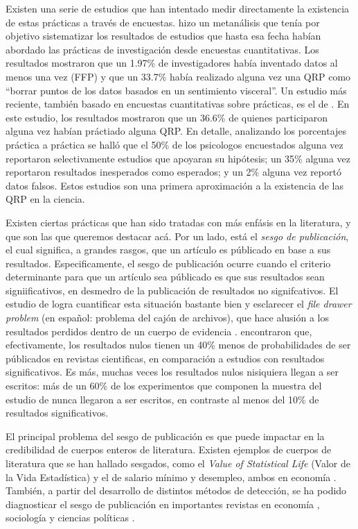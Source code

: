 \documentclass[
]{book}
\begin{document}
Existen una serie de estudios que han intentado medir directamente la existencia de estas prácticas a través de encuestas. \citet{fanelli_How_2009} hizo un metanálisis que tenía por objetivo sistematizar los resultados de estudios que hasta esa fecha habían abordado las prácticas de investigación desde encuestas cuantitativas. Los resultados mostraron que un 1.97\% de investigadores había inventado datos al menos una vez (FFP) y que un 33.7\% había realizado alguna vez una QRP como ``borrar puntos de los datos basados en un sentimiento visceral''. Un estudio más reciente, también basado en encuestas cuantitativas sobre prácticas, es el de \citet{john_Measuring_2012}. En este estudio, los resultados mostraron que un 36.6\% de quienes participaron alguna vez habían práctiado alguna QRP. En detalle, analizando los porcentajes práctica a práctica se halló que el 50\% de los psicologos encuestados alguna vez reportaron selectivamente estudios que apoyaran su hipótesis; un 35\% alguna vez reportaron resultados inesperados como esperados; y un 2\% alguna vez reportó datos falsos. Estos estudios son una primera aproximación a la existencia de las QRP en la ciencia.

Existen ciertas prácticas que han sido tratadas con más enfásis en la literatura, y que son las que queremos destacar acá. Por un lado, está el \emph{sesgo de publicación}, el cual significa, a grandes rasgos, que un artículo es públicado en base a sus resultados. Especificamente, el sesgo de publicación ocurre cuando el criterio determinante para que un artículo sea públicado es que sus resultados sean signiificativos, en desmedro de la publicación de resultados no signifcativos. El estudio de \citet{franco_Publication_2014} logra cuantificar esta situación bastante bien y esclarecer el \emph{file drawer problem} (en español: problema del cajón de archivos), que hace alusión a los resultados perdidos dentro de un cuerpo de evidencia \citep[p.39]{christensen_Transparent_2019}. \citet{franco_Publication_2014} encontraron que, efectivamente, los resultados nulos tienen un 40\% menos de probabilidades de ser públicados en revistas cientificas, en comparación a estudios con resultados significativos. Es más, muchas veces los resultados nulos nisiquiera llegan a ser escritos: más de un 60\% de los experimentos que componen la muestra del estudio de \citet{franco_Publication_2014} nunca llegaron a ser escritos, en contraste al menos del 10\% de resultados significativos.

El principal problema del sesgo de publicación es que puede impactar en la credibilidad de cuerpos enteros de literatura. Existen ejemplos de cuerpos de literatura que se han hallado sesgados, como el \emph{Value of Statistical Life} (Valor de la Vida Estadística) y el de salario mínimo y desempleo, ambos en economía \citep[para detalle ver p.42 y p.46 en][]{christensen_Transparent_2019}. También, a partir del desarrollo de distintos métodos de detección, se ha podido diagnosticar el sesgo de publicación en importantes revistas en economía \citet{brodeur_Star_2016}, sociología y ciencias políticas \citep{gerber_Publication_2008, gerber_Statistical_2008}.
\end{document}
